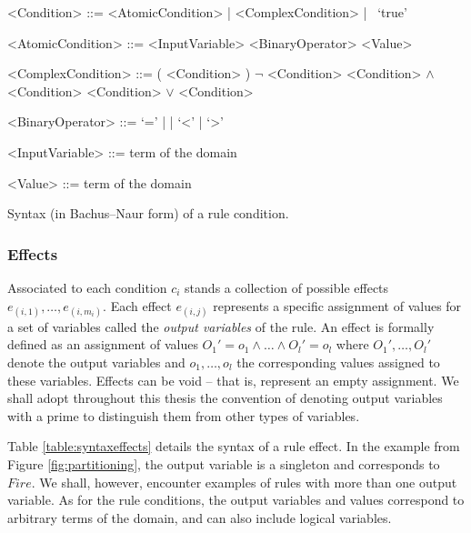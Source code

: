 \setlength{\grammarindent}{12em} 

\begin{table}[h]
\vspace{3mm}
\begin{grammar}

<Condition> ::= <AtomicCondition> | <ComplexCondition> | \ `true'

<AtomicCondition> ::= <InputVariable> <BinaryOperator> <Value>

<ComplexCondition> ::= ( <Condition> ) 
\alt $\lnot$ <Condition> 
\alt <Condition> $\land$ <Condition> 
\alt <Condition> $\lor$ <Condition>

<BinaryOperator> ::= `=' | \lit{$\neq$} | `\textless' | `\textgreater'

<InputVariable> ::= term of the domain

<Value> ::= term  of the domain

\end{grammar}
\caption{Syntax (in Bachus--Naur form) of a rule condition.}
\label{table:syntaxconditions}
\end{table}

\subsubsection*{Effects}

Associated to each condition $c_i$ stands a collection of possible effects $e_{(i,1)}, \dots, e_{(i,m_i)}$. Each effect $e_{(i,j)}$ represents a specific assignment of values for a set of variables called the \textit{output variables} of the rule.  An effect is formally defined as an assignment of values $O_1'\!=\!o_1 \land \dots \land O_{l}'\!=\!o_{l}$ where $O_1', \dots, O_{l}'$ denote the output variables and $o_1, \dots, o_{l}$ the corresponding values assigned to these variables. Effects can be void -- that is, represent an empty assignment. We shall adopt throughout this thesis the convention of denoting output variables with a prime to distinguish them from other types of variables. 

Table \ref{table:syntaxeffects} details the syntax of a rule effect. In the example from Figure \ref{fig:partitioning}, the output variable is a singleton and corresponds to $Fire$. We shall, however, encounter examples of rules with more than one output variable. As for the rule conditions, the output variables and values correspond to arbitrary terms of the domain, and can also include logical variables. 



